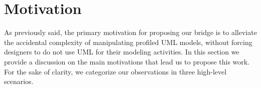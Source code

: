 \section{Motivation}\label{sec:motivation}

%
%
%

As previously said, the primary motivation for proposing our bridge is to alleviate the accidental complexity of manipulating profiled UML models, 
without forcing designers to do not use UML for their modeling activities.
In this section we provide a discussion on the main motivations that lead us to propose this work.
For the sake of clarity, we categorize our observations in three high-level scenarios. 

